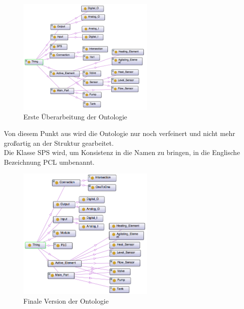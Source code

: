 \begin{figure}[hbt!]
  \centering
  \includegraphics[width=0.6\textwidth]{graphics/implementation/Ontology_v2}
  \caption{Erste Überarbeitung der Ontologie}
\end{figure}

Von diesem Punkt aus wird die Ontologie nur noch verfeinert und nicht mehr großartig an der Struktur gearbeitet.\\
Die Klasse SPS wird, um Konsistenz in die Namen zu bringen, in die Englische Bezeichnung PCL umbenannt. 

\begin{figure}[hbt!]
  \centering
  \includegraphics[width=0.6\textwidth]{graphics/implementation/Ontology_final}
  \caption{Finale Version der Ontologie}
\end{figure}

